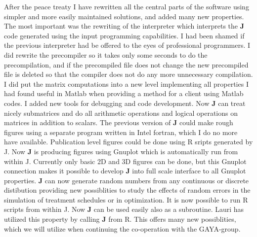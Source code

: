 After the peace treaty I have rewritten all the central parts of the
software using simpler and more easily maintained solutions,
and added many new properties. The most important was the rewriting
of the interpreter
which interprets the \textbf{J} code generated using the input programming capabilities.
I had been shamed if the previous interpreter had be offered to the eyes of
professional programmers. I did rewrite the precompiler so it takes only some
seconds to do the precompilation, and if the precompiled file
does not change the new precompiled file is deleted so that the compiler
does not do any more unnecessary compilation. I did put the matrix computations
into a new level implementing
all properties I had found useful in Matlab when providing a method for a client
using Matlab codes. I added new tools for debugging
and code development. Now \textbf{J} can treat nicely submatrices and do
all arithmetic operations and logical operations
on matrices in addition to scalars. The previous version of  \textbf{J} could make rough
figures using a separate program written in Intel
fortran, which I do no more have available. Publication level
figures could be done using R sripts generated by J.
Now \textbf{J} is producing figures using Gnuplot which is automatically run from within J.
Currently only basic 2D and 3D figures
can be done, but this Gnuplot connection makes it possible to develop \textbf{J}
into full scale interface to all Gnuplot properties. \textbf{J} can now generate random numbers from any
continuous or discrete distibution providing new possiblities to study the
effects of random errors in the simulation of treatment schedules or in
optimization. It is now  possible to run R scripts from within J.
Now \textbf{J} can be used easily also as a subroutine. Lauri has utilized this property
by calling \textbf{J} from R. This offers many new possiblities,
which we will utilize when
continuing the co-operation with the GAYA-group.

